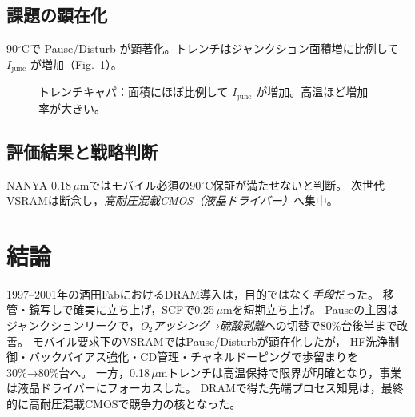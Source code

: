 \documentclass[conference]{IEEEtran}
\begin{document}
\subsection{課題の顕在化}
90$^\circ$Cで Pause/Disturb が顕著化。トレンチはジャンクション面積増に比例して $I_{\mathrm{junc}}$ が増加（Fig.~\ref{fig:trench_area_leak}）。

\begin{figure}[t]\centering
{}
\caption{トレンチキャパ：面積にほぼ比例して $I_{\mathrm{junc}}$ が増加。高温ほど増加率が大きい。}
\label{fig:trench_area_leak}
\end{figure}

\subsection{評価結果と戦略判断}
NANYA 0.18\,$\mu$mではモバイル必須の90$^\circ$C保証が満たせないと判断。
次世代VSRAMは断念し，\emph{高耐圧混載CMOS（液晶ドライバー）}へ集中。

\section{結論}
1997–2001年の酒田FabにおけるDRAM導入は，目的ではなく\emph{手段}だった。
移管・鏡写しで確実に立ち上げ，SCFで0.25\,$\mu$mを短期立ち上げ。
Pauseの主因はジャンクションリークで，\emph{O$_2$アッシング→硫酸剥離}への切替で80\%台後半まで改善。
モバイル要求下のVSRAMではPause/Disturbが顕在化したが，
HF洗浄制御・バックバイアス強化・CD管理・チャネルドーピングで歩留まりを30\%→80\%台へ。
一方，0.18\,$\mu$mトレンチは高温保持で限界が明確となり，事業は液晶ドライバーにフォーカスした。
DRAMで得た先端プロセス知見は，最終的に高耐圧混載CMOSで競争力の核となった。
\end{document}

